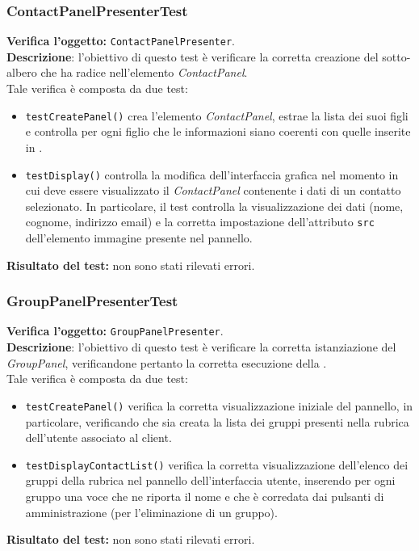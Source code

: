 \subsubsection{ContactPanelPresenterTest}
\textbf{Verifica l'oggetto:} \texttt{ContactPanelPresenter}.\\
\textbf{Descrizione}: l'obiettivo di questo test è verificare la corretta creazione del sotto-albero che ha radice nell'elemento \textit{ContactPanel}.\\
Tale verifica è composta da due test:
\begin{itemize}
\item \texttt{testCreatePanel()} crea l'elemento \textit{ContactPanel}, estrae la lista dei suoi figli e controlla per ogni figlio che le informazioni siano coerenti con quelle inserite in .
\item \texttt{testDisplay()} controlla la modifica dell'interfaccia grafica nel momento in cui deve essere visualizzato il \textit{ContactPanel} contenente i dati di un contatto selezionato. In particolare, il test controlla la visualizzazione dei dati (nome, cognome, indirizzo email) e la corretta impostazione dell'attributo \texttt{src} dell'elemento immagine presente nel pannello.
\end{itemize}
\textbf{Risultato del test:} non sono stati rilevati errori.

\subsubsection{GroupPanelPresenterTest}
\textbf{Verifica l'oggetto:} \texttt{GroupPanelPresenter}.\\
\textbf{Descrizione}: l'obiettivo di questo test è verificare la corretta istanziazione del \textit{GroupPanel}, verificandone pertanto la corretta esecuzione della .\\
Tale verifica è composta da due test:
\begin{itemize}
\item \texttt{testCreatePanel()} verifica la corretta visualizzazione iniziale del pannello, in particolare, verificando che sia creata la lista dei gruppi presenti nella rubrica dell'utente associato al client.
\item \texttt{testDisplayContactList()} verifica la corretta visualizzazione dell'elenco dei gruppi della rubrica nel pannello dell'interfaccia utente, inserendo per ogni gruppo una voce che ne riporta il nome e che è corredata dai pulsanti di amministrazione (per l'eliminazione di un gruppo).
\end{itemize}
\textbf{Risultato del test:} non sono stati rilevati errori.

